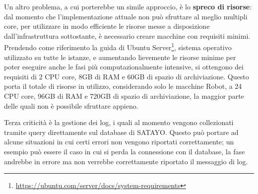 Un altro problema, a cui porterebbe un simile approccio, è lo \textbf{spreco di
risorse}: dal momento che l'implementazione attuale non può sfruttare al meglio
multipli core, per utilizzare in modo efficiente le risorse messe a disposizione
dall'infrastruttura sottostante, è necessario creare macchine con requisiti
minimi. Prendendo come riferimento la guida di Ubuntu Server\footnote{\url{https://ubuntu.com/server/docs/system-requirements}},
sistema operativo utilizzato su tutte le istanze, e aumentando lievemente le
risorse minime per poter eseguire anche le fasi più computazionalmente intensive,
si ottengono dei requisiti di 2 CPU core, 8GB di RAM e 60GB di spazio di
archiviazione. Questo porta il totale di risorse in utilizzo, considerando solo
le macchine Robot, a 24 CPU core, 96GB di RAM e 720GB di spazio di archiviazione,
la maggior parte delle quali non è possibile sfruttare appieno.

Terza criticità è la gestione dei log, i quali al momento vengono collezionati
tramite query direttamente sul database di SATAYO. Questo può portare ad alcune situazioni
in cui certi errori non vengono riportati correttamente; un esempio può essere
il caso in cui si perda la connessione con il database, la fase andrebbe in errore
ma non verrebbe correttamente riportato il messaggio di log.